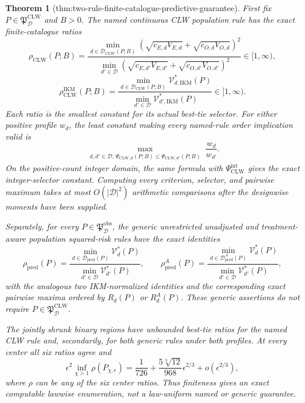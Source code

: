 \documentclass{article}
\newtheorem{theorem}{Theorem}
\begin{document}
\begin{theorem}[thm:two-rule-finite-catalogue-predictive-guarantee]\label{thm:two-rule-finite-catalogue-predictive-guarantee}
First fix \(P\in\mathfrak P_{\mathcal D}^{\mathrm{CLW}}\) and \(B>0\). The named continuous CLW population rule has the exact finite-catalogue ratios
\[
 \rho_{\mathrm{CLW}}(P;B)
 =\frac{\min_{d\in\mathcal D_{\mathrm{CLW}}(P;B)}
 (\sqrt{c_{E,d}V_{E,d}}+\sqrt{c_{O,d}V_{O,d}})^2}
 {\min_{d'\in\mathcal D}
 (\sqrt{c_{E,d'}V_{E,d'}}+\sqrt{c_{O,d'}V_{O,d'}})^2}
 \in[1,\infty),                                            \tag{1}
\]
\[
 \rho_{\mathrm{CLW}}^{\mathrm{IKM}}(P;B)
 =\frac{\min_{d\in\mathcal D_{\mathrm{CLW}}(P;B)}
 \mathcal V_{d,\mathrm{IKM}}^*(P)}
 {\min_{d'\in\mathcal D}\mathcal V_{d',\mathrm{IKM}}^*(P)}
 \in[1,\infty).                                            \tag{2}
\]
Each ratio is the smallest constant for its actual best-tie selector. For either positive profile \(w_d\), the least constant making every named-rule order implication valid is
\[
 \max_{\substack{d,d'\in\mathcal D:\,
 \Psi_{\mathrm{CLW},d}(P;B)
 \le\Psi_{\mathrm{CLW},d'}(P;B)}}\frac{w_d}{w_{d'}}.       \tag{3}
\]
On the positive-count integer domain, the same formula with \(\Psi_{\mathrm{CLW}}^{\mathrm{int}}\) gives the exact integer-selector constant. Computing every criterion, selector, and pairwise maximum takes at most \(O(|\mathcal D|^2)\) arithmetic comparisons after the designwise moments have been supplied.

Separately, for every \(P\in\mathfrak P_{\mathcal D}^{\mathrm{obs}}\), the generic unrestricted unadjusted and treatment-aware population squared-risk rules have the exact identities
\[
 \rho_{\mathrm{pred}}(P)
 =\frac{\min_{d\in\mathcal D_{\mathrm{pred}}(P)}\mathcal V_d^*(P)}
 {\min_{d'\in\mathcal D}\mathcal V_{d'}^*(P)},
 \qquad
 \rho_{\mathrm{pred}}^A(P)
 =\frac{\min_{d\in\mathcal D_{\mathrm{pred}}^A(P)}\mathcal V_d^*(P)}
 {\min_{d'\in\mathcal D}\mathcal V_{d'}^*(P)},            \tag{4}
\]
with the analogous two IKM-normalized identities and the corresponding exact pairwise maxima ordered by \(R_d(P)\) or \(R_d^A(P)\). These generic assertions do not require \(P\in\mathfrak P_{\mathcal D}^{\mathrm{CLW}}\).

The jointly shrunk binary regions have unbounded best-tie ratios for the named CLW rule and, secondarily, for both generic rules under both profiles. At every center all six ratios agree and
\[
 \epsilon^2\inf_{\chi>1}\rho(P_{\chi,\epsilon})
 =\frac1{726}+\frac{5\sqrt[3]{12}}{968}\epsilon^{2/3}
 +o(\epsilon^{2/3}),                                       \tag{5}
\]
where \(\rho\) can be any of the six center ratios. Thus finiteness gives an exact computable lawwise enumeration, not a law-uniform named or generic guarantee.
\end{theorem}
\end{document}
